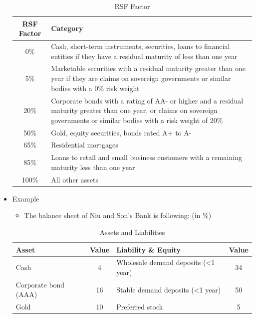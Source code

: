\begin{itemize}
\begin{table}[H]
    \centering
    \caption{RSF Factor}
    \renewcommand{\arraystretch}{1.5} %
    \begin{tabular}{|c|p{14cm}|}
        \hline
        \textbf{RSF Factor} & \textbf{Category} \\
        \hline
        0\% & Cash, short-term instruments, securities, loans to financial entities if they have a residual maturity of less than one year \\
        \hline
        5\% & Marketable securities with a residual maturity greater than one year if they are claims on sovereign governments or similar bodies with a 0\% risk weight \\
        \hline
        20\% & Corporate bonds with a rating of AA- or higher and a residual maturity greater than one year, or claims on sovereign governments or similar bodies with a risk weight of 20\% \\
        \hline
        50\% & Gold, equity securities, bonds rated A+ to A- \\
        \hline
        65\% & Residential mortgages \\
        \hline
        85\% & Loans to retail and small business customers with a remaining maturity less than one year \\
        \hline
        100\% & All other assets \\
        \hline
    \end{tabular}
\end{table}
\item Example
\begin{itemize}
    \item The balance sheet of Niu and Son's Bank is following: (in \%)
    \end{itemize}
    \begin{table}[H]
        \centering
        \caption{Assets and Liabilities}
        \begin{tabular}{|l|c|l|c|}
            \hline
            \textbf{Asset} & \textbf{Value} & \textbf{Liability \& Equity} & \textbf{Value} \\
            \hline
            Cash & 4 & Wholesale demand deposits (<1 year) & 34 \\
            \hline
            Corporate bond (AAA) & 16 & Stable demand deposits (<1 year) & 50 \\
            \hline
            Gold & 10 & Preferred stock & 5 \\
            \hline

\end{tabular}
\end{table}
\end{itemize}
